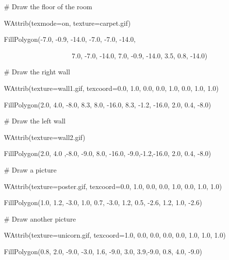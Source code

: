 \documentclass[letterpaper]{article}
\begin{document}
{\sffamily
\ \ \ \# Draw the floor of the room}

{\sffamily
\ \ \ WAttrib({\textquotedbl}texmode=on{\textquotedbl}, {\textquotedbl}texture=carpet.gif{\textquotedbl})}

{\sffamily
\ \ \ FillPolygon(-7.0, -0.9, -14.0, -7.0, -7.0, -14.0,}

{\sffamily
\ \ \ \ \ \ \ \ \ \ \ \ \ \ \ \ \ \ \ \ \ \ \ 7.0, -7.0, -14.0, 7.0, -0.9, -14.0, 3.5, 0.8, -14.0)}


\bigskip

{\sffamily
\ \ \ \# Draw the right wall}

{\sffamily
\ \ \ WAttrib({\textquotedbl}texture=wall1.gif{\textquotedbl}, {\textquotedbl}texcoord=0.0, 1.0, 0.0, 0.0, 1.0, 0.0,
1.0, 1.0{\textquotedbl})}

{\sffamily
\ \ \ FillPolygon(2.0, 4.0, -8.0, 8.3, 8.0, -16.0, 8.3, -1.2, -16.0, 2.0, 0.4, -8.0)}


\bigskip

{\sffamily
\ \ \ \# Draw the left wall}

{\sffamily
\ \ \ WAttrib({\textquotedbl}texture=wall2.gif{\textquotedbl})}

{\sffamily
\ \ \ FillPolygon(2.0, 4.0 ,-8.0, -9.0, 8.0, -16.0, -9.0,-1.2,-16.0, 2.0, 0.4, -8.0)}


\bigskip

{\sffamily
\ \ \ \# Draw a picture}

{\sffamily
\ \ \ WAttrib({\textquotedbl}texture=poster.gif{\textquotedbl}, {\textquotedbl}texcoord=0.0, 1.0, 0.0, 0.0, 1.0, 0.0,
1.0, 1.0{\textquotedbl})}

{\sffamily
\ \ \ FillPolygon(1.0, 1.2, -3.0, 1.0, 0.7, -3.0, 1.2, 0.5, -2.6, 1.2, 1.0, -2.6)}


\bigskip

{\sffamily
\ \ \ \# Draw another picture}

{\sffamily
\ \ \ WAttrib({\textquotedbl}texture=unicorn.gif{\textquotedbl}, {\textquotedbl}texcoord=1.0, 0.0, 0.0, 0.0, 0.0, 1.0,
1.0, 1.0{\textquotedbl})}

{\sffamily
\ \ \ FillPolygon(0.8, 2.0, -9.0, -3.0, 1.6, -9.0, 3.0, 3.9,-9.0, 0.8, 4.0, -9.0)}
\end{document}
